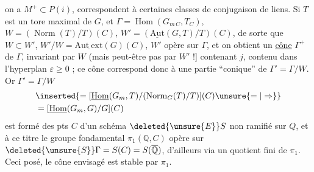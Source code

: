 on a $M^+\subset P(i)$,  correspondent à certaines classes de conjugaison de liens. Si $T$ est un tore maximal de $G$, et $\Gamma=\operatorname{Hom}(G_{m\,C},T_C)$, $W=(\operatorname{Norm}(T)/T)(C)$, $W'=(\underline{\mathrm{Aut}}(G,T)/T)(C)$, de sorte que $W\subset W'$, $W'/W=\underline{\mathrm{Aut\ ext}}(G)(C)$, $W'$ opère sur $\Gamma$, et on obtient un \uline{cône}  $\Gamma^+$ de $\Gamma$, invariant par $W$ (mais peut-être pas par $W'$ !] contenant $j$, contenu dans l'hyperplan $\varepsilon\geq 0$ ;  ce cône correspond donc à une partie ``conique'' de $\Gamma'=\Gamma/W$. Or $\Gamma'=\Gamma/W$
\[
\begin{aligned}
&\inserted{=[\underline{\mathrm{Hom}}(G_m,T)/(\operatorname{Norm}_G(T)/T)](C)\unsure{=|\Rightarrow}}\\
&=[\underline{\mathrm{Hom}}(G_m,G)/G](C)
\end{aligned}
\]
est formé des pts   $C$ d'un schéma $\deleted{\unsure{E}}S$ non ramifié sur $Q$, et à ce titre le groupe fondamental $\pi_1(\mathbb{Q},C)$ opère sur \unsure{!} $\deleted{\unsure{S}}\Gamma=S(C)=S(\overline{\mathbb{Q}})$, d'ailleurs via un quotient fini de $\pi_1$. Ceci posé, le cône envisagé  est stable par $\pi_1$.
